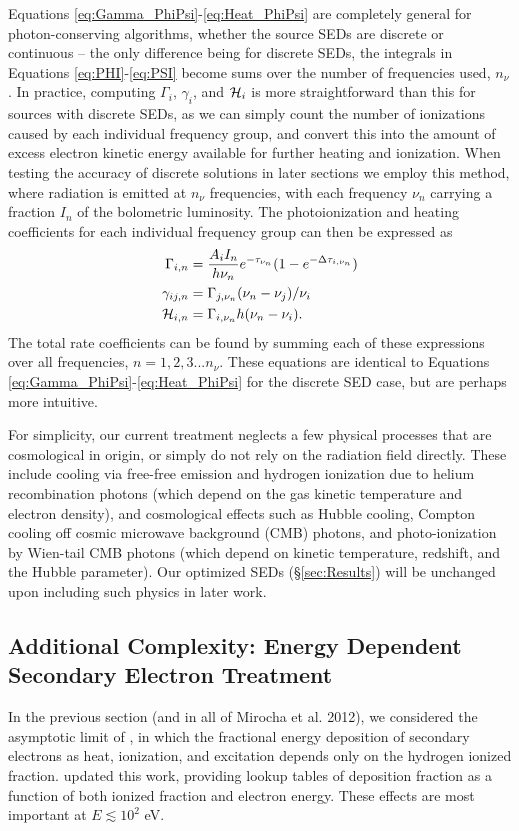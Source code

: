 \documentclass[letterpaper,titlepage,12pt]{article}
\numberwithin{equation}{section}
\begin{document}
Equations \ref{eq:Gamma_PhiPsi}-\ref{eq:Heat_PhiPsi} are completely general
for photon-conserving algorithms, whether the source SEDs are discrete or
continuous -- the only difference being for discrete SEDs, the integrals in
Equations \ref{eq:PHI}-\ref{eq:PSI} become sums over the number of frequencies
used, $n_{\nu}$. In practice, computing $\Gamma_i$, $\gamma_i$, and $\mathcal{H}_i$
is more straightforward than this for sources with discrete SEDs, as we can
simply count the number of ionizations caused by each individual frequency
group, and convert this into the amount of excess electron kinetic energy
available for further heating and ionization. When testing the accuracy of
discrete solutions in later sections we employ this method, where radiation is
emitted at $n_{\nu}$ frequencies, with each frequency $\nu_n$ carrying a
fraction $I_n$ of the bolometric luminosity. The photoionization and heating
coefficients for each individual frequency group can then be expressed as
\begin{align}
    \Gamma_{i,n} & = \frac{A_i I_n}{h \nu_n} e^{-\tau_{\nu_n}}(1 - e^{-\Delta \tau_{i,\nu_n}}) \label{eq:Gamma_simple}\\
    \gamma_{ij,n} & = \Gamma_{j,\nu_n} (\nu_n-\nu_j) / \nu_i \label{eq:gamma_simple} \\
    \mathcal{H}_{i,n} & = \Gamma_{i,\nu_n} h(\nu_n - \nu_i) \label{eq:Heat_simple}.
\end{align}    
The total rate coefficients can be found by summing each of these expressions
over all frequencies, $n=1,2,3...n_{\nu}$. These equations are identical to
Equations \ref{eq:Gamma_PhiPsi}-\ref{eq:Heat_PhiPsi} for the discrete SED
case, but are perhaps more intuitive.

For simplicity, our current treatment neglects a few physical processes that
are cosmological in origin, or simply do not rely on the radiation field
directly. These include cooling via free-free emission and hydrogen ionization
due to helium recombination photons (which depend on the gas kinetic
temperature and electron density), and cosmological effects such as Hubble
cooling, Compton cooling off cosmic microwave background (CMB) photons, and
photo-ionization by Wien-tail CMB photons (which depend on kinetic
temperature, redshift, and the Hubble parameter). Our optimized SEDs
(\S\ref{sec:Results}) will be unchanged upon including such physics in later
work.

\subsection{Additional Complexity: Energy Dependent Secondary Electron Treatment}
In the previous section (and in all of Mirocha et al. 2012), we considered the asymptotic limit of \citet{Shull1985}, in which the fractional energy deposition of secondary electrons as heat, ionization, and excitation depends only on the hydrogen ionized fraction.  \citet{Furlanetto2010} updated this work, providing lookup tables of deposition fraction as a function of both ionized fraction and electron energy.  These effects are most important at $E \lesssim 10^2$ eV.  
\end{document}
